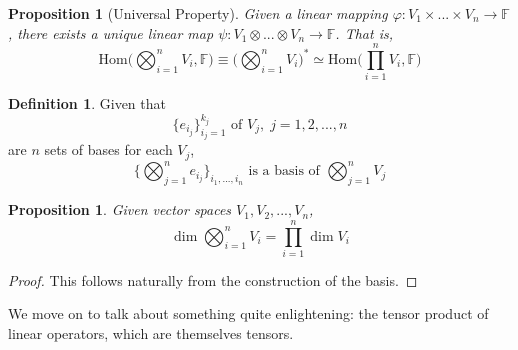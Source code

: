 \documentclass{article}
\newtheorem{proposition}[theorem]{Proposition}
\theoremstyle{remark}
\theoremstyle{definition}
\newtheorem{definition}{Definition}[section]
\begin{document}
    \begin{proposition}[Universal Property]
    Given a linear mapping $\varphi: V_1 \times ... \times V_n \longrightarrow \mathbb{F}$, there exists a unique linear map $\psi: V_1 \otimes ... \otimes V_n \longrightarrow \mathbb{F}$. That is, 
    \[\text{Hom}\Big( \bigotimes_{i=1}^n V_i, \mathbb{F} \Big) \equiv \bigg( \bigotimes_{i=1}^n V_i \bigg)^* \simeq \text{Hom}\Big(\prod_{i=1}^n V_i, \mathbb{F}\Big)\]
    \end{proposition}

    \begin{definition}
    Given that 
    \[ \{ e_{i_{j}}\}_{i_{j}=1}^{k_{j}} \text{ of } V_{j},\; j = 1, 2, ..., n\]
    are $n$ sets of bases for each $V_{j}$, 
    \[ \{ \bigotimes_{j=1}^{n} e_{i_{j}} \}_{i_{1}, ..., i_{n}} \text{ is a basis of } \bigotimes_{j=1}^{n} V_{j}\]
    \end{definition}

    \begin{proposition}
    Given vector spaces $V_1, V_2, ..., V_n$, 
    \[ \dim \bigotimes_{i=1}^{n} V_i = \prod_{i=1}^{n} \dim V_{i}\]
    \end{proposition}
    \begin{proof}
    This follows naturally from the construction of the basis.
    \end{proof}

    We move on to talk about something quite enlightening: the tensor product of linear operators, which are themselves tensors. 
\end{document}
